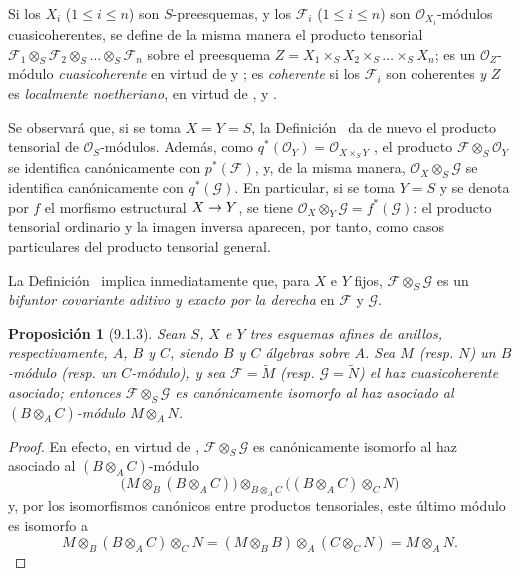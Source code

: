 \documentclass[oneside]{amsart}
\theoremstyle{ega-env-style}
\theoremstyle{ega-thm-env-style}
\newtheorem*{proposition}{Proposición}
\theoremstyle{ega-defn-env-style}
\def\leq{\leqslant}                 %
\renewcommand{\to}{\mathchoice{\longrightarrow}{\rightarrow}{\rightarrow}{\rightarrow}}
\newcommand{\oldpage}[2][]{{\marginnote{\normalfont{\textbf{#1}~|~#2}}}\ignorespaces}
\let\EGAOriginalLabel\label
\renewcommand{\label}[1]{\phantomsection\EGAOriginalLabel{#1}}
\begin{document}
Si los $X_i$ ($1\leq i\leq n$) son $S$-preesquemas, y los $\mathscr{F}_i$ ($1\leq i\leq n$) son
$\mathscr{O}_{X_i}$-módulos cuasicoherentes, se define de la misma manera el producto tensorial
$\mathscr{F}_1\otimes_S\mathscr{F}_2\otimes_S\ldots\otimes_S\mathscr{F}_n$ sobre el
preesquema $Z=X_1\times_S X_2\times_S\ldots\times_S X_n$; es un
$\mathscr{O}_Z$-módulo \emph{cuasicoherente} en virtud de  y
; es \emph{coherente} si los $\mathscr{F}_i$ son coherentes \emph{y}
$Z$ es \emph{localmente noetheriano}, en virtud de ,
 y .

Se observará que, si se toma $X=Y=S$, la Definición~ da de nuevo el producto
tensorial de $\mathscr{O}_S$-módulos. Además, como $q^*(\mathscr{O}_Y)=\mathscr{O}_{X\times_S Y}$
, el producto $\mathscr{F}\otimes_S\mathscr{O}_Y$ se identifica
canónicamente con $p^*(\mathscr{F})$, y, de la misma manera,
$\mathscr{O}_X\otimes_S\mathscr{G}$ se identifica canónicamente con $q^*(\mathscr{G})$. En
particular, si se toma $Y=S$ y se denota por $f$ el morfismo estructural $X\to Y$,
se tiene $\mathscr{O}_X\otimes_Y\mathscr{G}=f^*(\mathscr{G})$: el producto tensorial ordinario
y la imagen inversa aparecen, por tanto, como casos particulares del producto
tensorial general.

La Definición~ implica inmediatamente que, para $X$ e
$Y$ fijos, $\mathscr{F}\otimes_S\mathscr{G}$ es un \emph{bifuntor covariante aditivo y exacto por la derecha} en $\mathscr{F}$ y $\mathscr{G}$.

\begin{proposition}[9.1.3]
\label{I.9.1.3}
Sean $S$, $X$ e $Y$ tres esquemas afines de anillos,
respectivamente, $A$, $B$ y $C$, siendo $B$ y $C$ álgebras sobre $A$. Sea $M$
\textup{(resp. $N$)} un $B$-módulo \textup{(resp.} un $C$-módulo), y sea
$\mathscr{F}=\widetilde{M}$ \textup{(resp.} $\mathscr{G}=\widetilde{N}$) el
haz cuasicoherente asociado; entonces $\mathscr{F}\otimes_S\mathscr{G}$ es
canónicamente isomorfo al haz asociado al $(B\otimes_A C)$-módulo
$M\otimes_A N$.
\end{proposition}

\begin{proof}
\oldpage[I]{170}
En efecto, en virtud de , $\mathscr{F}\otimes_S\mathscr{G}$
es canónicamente isomorfo al haz asociado al $(B\otimes_A C)$-módulo
\[
  \bigl(M\otimes_B(B\otimes_A C)\bigr)
  \otimes_{B\otimes_A C}
  \bigl((B\otimes_A C)\otimes_C N\bigr)
\]
y, por los isomorfismos canónicos entre productos tensoriales, este último módulo es isomorfo a
\[
  M\otimes_B(B\otimes_A C)\otimes_C N
  =(M\otimes_B B)\otimes_A(C\otimes_C N)=M\otimes_A N.
\]
\end{proof}
\end{document}

